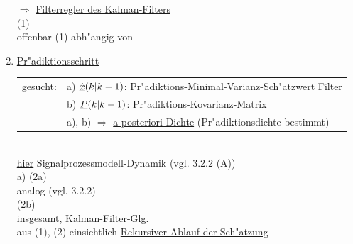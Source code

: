 \documentclass[openany,a4paper,11pt]{book}
\begin{document}
\begin{enumerate}
    $\Rightarrow$ \uline{Filterregler des Kalman-Filters}\\[3pt]
     \quad (1)\\
    offenbar (1) abh"angig von
    \item \uline{Pr"adiktionsschritt}\\
    \begin{tabular}{ll}
    \uline{gesucht}: & a) $\uline{\hat{x}}(k|k-1)$: \uline{Pr"adiktions-Minimal-Varianz-Sch"atzwert} \uline{Filter}\\
    & b) $\uline{P}(k|k-1)$: \uline{Pr"adiktions-Kovarianz-Matrix} \\
    & a), b) $\Rightarrow$ \uline{a-posteriori-Dichte} (Pr"adiktionsdichte bestimmt)\\
    \end{tabular}\\
    \uline{hier} Signalprozessmodell-Dynamik (vgl. 3.2.2 (A))\\
    a)  \quad (2a)\\
    analog (vgl. 3.2.2)\\
     \quad (2b)\\
    insgesamt, Kalman-Filter-Glg. \\
    aus (1), (2) einsichtlich \uline{Rekursiver Ablauf der Sch"atzung}\\
\end{enumerate}
\end{document}
